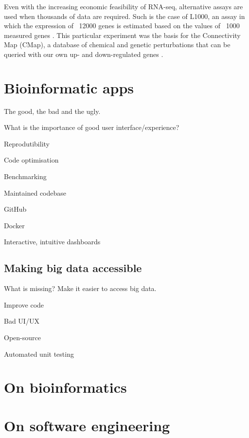 Even with the increasing economic feasibility of RNA-seq, alternative assays are used when thousands of data are required. Such is the case of L1000, an assay in which the expression of ~12000 genes is estimated based on the values of ~1000 measured genes \cite{subramanian:2017ul}. This particular experiment was the basis for the Connectivity Map (CMap), a database of chemical and genetic perturbations that can be queried with our own up- and down-regulated genes \cite{subramanian:2017ul}. %

\section{Bioinformatic apps}

The good, the bad and the ugly.

What is the importance of good user interface/experience?

Reprodutibility

Code optimisation

Benchmarking

Maintained codebase

GitHub

Docker

Interactive, intuitive dashboards

\subsection{Making big data accessible}

What is missing? Make it easier to access big data.

Improve code

Bad UI/UX

Open-source

Automated unit testing

\section{On bioinformatics}

\section{On software engineering}

